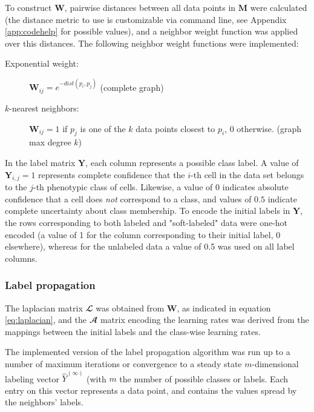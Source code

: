\documentclass[oneside, a4paper, draft]{memoir} %
\begin{document}
To construct $\mathbf{W}$, pairwise distances between all data points in $\mathbf{M}$ were calculated (the 
distance metric to use is customizable via command line, see Appendix \ref{app:codehelp} for possible values), and a
neighbor weight function was applied over this distances. The following neighbor weight functions were implemented:
\begin{description}
	\item[Exponential weight:] $\mathbf{W}_{ij} = e^{-dist(p_i,p_j)}$ (complete graph)
	\item[$k$-nearest neighbors:] $\mathbf{W}_{ij} = 1$ if $p_j$ is one of the $k$ data points closest
		to $p_i$, 0 otherwise. (graph max degree $k$)
\end{description}

In the label matrix $\mathbf Y$, each column represents a possible class label. A value of $\mathbf{Y}_{i,j}=1$
represents complete confidence that the $i$-th cell in the data set belongs to the $j$-th phenotypic class of cells.
Likewise, a value of $0$ indicates absolute confidence that a cell does \emph{not} correspond to a class, and
values of $0.5$ indicate complete uncertainty about class membership. To encode the initial labels in $\mathbf Y$,
the rows corresponding to both labeled and "soft-labeled" data were one-hot encoded (a value of 1 for the column
corresponding to their initial label, 0 elsewhere), whereas for the unlabeled data a value of 0.5 was used on
all label columns.


\subsubsection{Label propagation}
The laplacian matrix $\mathbfcal{L}$ was obtained from $\mathbf W$, as indicated in equation \ref{eq:laplacian}, and
the $\mathbfcal A$ matrix encoding the learning rates was derived from the mappings between the initial labels
and the class-wise learning rates.

The implemented version of the label propagation algorithm was run up to a number of maximum iterations or
convergence to a steady state $m$-dimensional labeling vector $\hat{Y}^{(\infty)}$ (with $m$ the number of possible
classes or labels. Each entry on this vector represents a data point, and contains the values spread by the
neighbors' labels.
\end{document}
